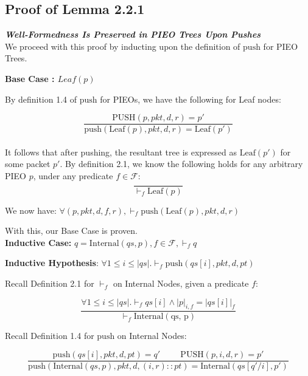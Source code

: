 \documentclass{article}
\begin{document}
\subsection{Proof of Lemma 2.2.1}
\textit{\textbf{Well-Formedness Is Preserved in PIEO Trees Upon Pushes}}\\[10pt]

We proceed with this proof by inducting upon the definition of $\text{push}$ for PIEO Trees.\newline

\textbf{Base Case : $Leaf(p)$}\newline

By definition 1.4 of $\text{push}$ for PIEOs, we have the following for Leaf nodes:

$$\frac{\text{PUSH}(p, pkt, d, r) = p'}{\text{push}(\text{Leaf}(p), pkt, d, r) = \text{Leaf}(p')}$$\\[-10pt]

It follows that after pushing, the resultant tree is expressed as $\text{Leaf}(p')$ for some packet $p'$. By definition 2.1, we know the following holds for any arbitrary PIEO $p$, under any predicate $f \in \mathcal{F}$:\\[-10pt]

$$\frac{}{\vdash_f \text{Leaf}(p)}$$

We now have: $\forall (p, pkt, d, f, r), \vdash_f \text{push}(\text{Leaf}(p), pkt, d, r)$\newline

With this, our Base Case is proven.\\[10pt]

\textbf{Inductive Case:} $q = \text{Internal}(qs, p), f \in \mathcal{F}, \vdash_f q$\newline

\textbf{Inductive Hypothesis}: $\forall 1 \leq i \leq |qs|. \vdash_f \text{push}(qs[i], pkt, d, pt)$\newline

Recall Definition 2.1 for $\vdash_f$ on Internal Nodes, given a predicate $f$:

$$\frac{\forall 1 \leq i \leq |qs|. \vdash_f qs[i] \land |p|_{i, f} = |qs[i]|_f}{\vdash_f \text{Internal}(\text{qs, p})}$$\newline

Recall Definition 1.4 for $\text{push}$ on Internal Nodes:

$$\frac{\text{push}(qs[i], pkt, d, pt) = q' \hspace{1cm} \text{PUSH}(p, i, d, r) = p'}{\text{push}(\text{Internal}(qs, p), pkt, d, (i, r) :: pt) = \text{Internal}(qs[q'/i], p')}$$\newline
\end{document}
